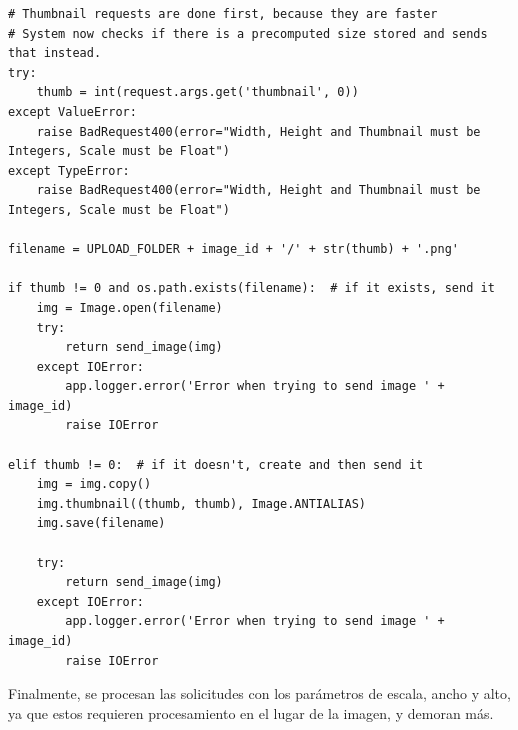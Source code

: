 \documentclass[11pt,letterpaper]{article}
\begin{document}
\begin{lstlisting}[title=Extracto de código encargado de manejar solicitudes de tamaños precalculados.]
# Thumbnail requests are done first, because they are faster
# System now checks if there is a precomputed size stored and sends that instead.
try:
    thumb = int(request.args.get('thumbnail', 0))
except ValueError:
    raise BadRequest400(error="Width, Height and Thumbnail must be Integers, Scale must be Float")
except TypeError:
    raise BadRequest400(error="Width, Height and Thumbnail must be Integers, Scale must be Float")

filename = UPLOAD_FOLDER + image_id + '/' + str(thumb) + '.png'

if thumb != 0 and os.path.exists(filename):  # if it exists, send it
    img = Image.open(filename)
    try:
        return send_image(img)
    except IOError:
        app.logger.error('Error when trying to send image ' + image_id)
        raise IOError

elif thumb != 0:  # if it doesn't, create and then send it
    img = img.copy()
    img.thumbnail((thumb, thumb), Image.ANTIALIAS)
    img.save(filename)

    try:
        return send_image(img)
    except IOError:
        app.logger.error('Error when trying to send image ' + image_id)
        raise IOError
\end{lstlisting}

Finalmente, se procesan las solicitudes con los parámetros de escala, ancho y alto, ya que estos requieren procesamiento en el lugar de la imagen, y demoran más.

\newpage
\end{document}
